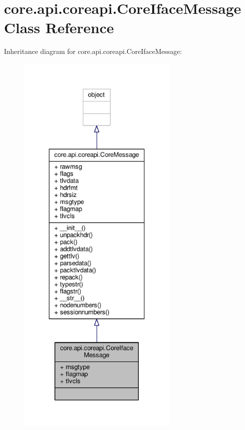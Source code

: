 \hypertarget{classcore_1_1api_1_1coreapi_1_1_core_iface_message}{\section{core.\+api.\+coreapi.\+Core\+Iface\+Message Class Reference}
\label{classcore_1_1api_1_1coreapi_1_1_core_iface_message}
}


Inheritance diagram for core.\+api.\+coreapi.\+Core\+Iface\+Message\+:
\nopagebreak
\begin{figure}[H]
\begin{center}
\leavevmode
\includegraphics[height=550pt]{classcore_1_1api_1_1coreapi_1_1_core_iface_message__inherit__graph}
\end{center}
\end{figure}


